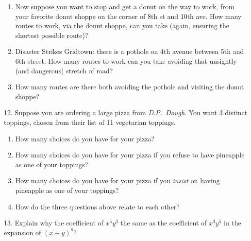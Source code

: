 \documentclass[10pt,]{book}
\theoremstyle{plain}
\theoremstyle{definition}
\numberwithin{equation}{chapter}
\begin{document}
\begin{exerciselist}
\begin{enumerate}[label=(\alph*)]
\item\hypertarget{li-249}{}
                Now suppose you want to stop and get a donut on the way to work, from your favorite donut shoppe on the corner of 8th st and 10th ave. How many routes to work, via the donut shoppe, can you take (again, ensuring the shortest possible route)?


\item\hypertarget{li-250}{}
                Disaster Strikes Gridtown: there is a pothole on 4th avenue between 5th and 6th street. How many routes to work can you take avoiding that unsightly (and dangerous) stretch of road?


\item\hypertarget{li-251}{}
                How many routes are there both avoiding the pothole and visiting the donut shoppe?


\end{enumerate}

\par\smallskip
\item[12.]\hypertarget{exercise-67}{}
            Suppose you are ordering a large pizza from \emph{D.P.~Dough}. You want 3 distinct toppings, chosen from their list of 11 vegetarian toppings.
          \leavevmode%
\begin{enumerate}[label=(\alph*)]
\item\hypertarget{li-252}{} How many choices do you have for your pizza? %
\item\hypertarget{li-253}{} How many choices do you have for your pizza if you refuse to have pineapple as one of your toppings? %
\item\hypertarget{li-254}{} How many choices do you have for your pizza if you \emph{insist} on having pineapple as one of your toppings? %
\item\hypertarget{li-255}{} How do the three questions above relate to each other? %
\end{enumerate}

\par\smallskip
\item[13.]\hypertarget{exercise-68}{}
            Explain why the coefficient of \(x^5y^3\) the same as the coefficient of \(x^3y^5\) in the expansion of \((x+y)^8\)?
\par\smallskip
\end{exerciselist}
\typeout{************************************************}
\typeout{************************************************}
\end{document}
